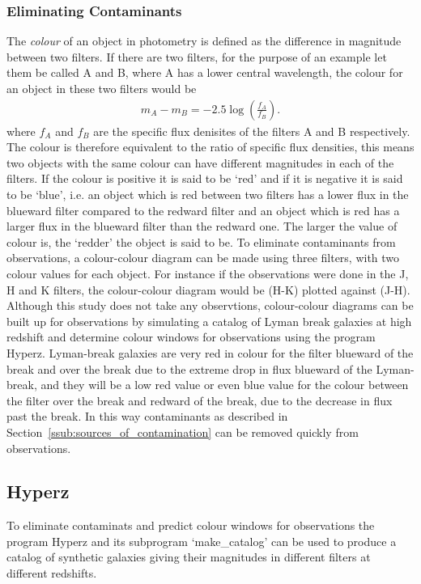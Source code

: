     	\subsubsection{Eliminating Contaminants} %
    	\label{sub:eliminatiing_contaminants}
			The \emph{colour} of an object in photometry is defined as the difference in magnitude between two filters\cite{Romanishin}. If there are two filters, for the purpose of an example let them be called A and B, where A has a lower central wavelength, the colour for an object in these two filters would be
			\begin{align}
				m_A-m_B=-2.5\log\left(\frac{f_A}{f_B}\right).
			\end{align}
			where $f_A$ and $f_B$ are the specific flux denisites of the filters A and B respectively\cite{Romanishin}. The colour is therefore equivalent to the ratio of specific flux densities, this means two objects with the same colour can have different magnitudes in each of the filters. If the colour is positive it is said to be `red' and if it is negative it is said to be `blue', i.e. an object which is red between two filters has a lower flux in the blueward filter compared to the redward filter and an object which is red has a larger flux in the blueward filter than the redward one.  The larger the value of colour is, the `redder' the object is said to be. To eliminate contaminants from observations, a colour-colour diagram can be made using three filters, with two colour values for each object. For instance if the observations were done in the J, H and K filters, the colour-colour diagram would be (H-K) plotted against (J-H). Although this study does not take any observtions, colour-colour diagrams can be built up for observations by simulating a catalog of Lyman break galaxies at high redshift and determine colour windows for observations using the program Hyperz. Lyman-break galaxies are very red in colour for the filter blueward of the break and over the break due to the extreme drop in flux blueward of the Lyman-break, and they will be a low red value or even blue value for the colour between the filter over the break and redward of the break, due to the decrease in flux past the break. In this way contaminants as described in Section~\ref{ssub:sources_of_contamination} can be removed quickly from observations.

    \subsection{Hyperz} %
	\label{sub:Hyperz}
		To eliminate contaminats and predict colour windows for observations the program Hyperz and its subprogram `make\_catalog' can be used to produce a catalog of synthetic galaxies giving their magnitudes in different filters at different redshifts.

